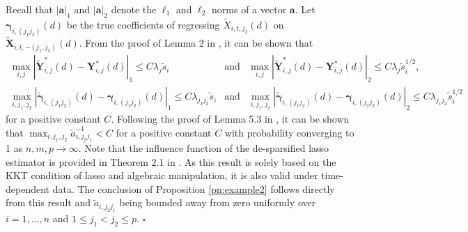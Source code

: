 \documentclass[12pt]{article}
\def\bea{\begin{eqnarray}}
\def\eea{\end{eqnarray}}
\def\nn{\nonumber}
\theoremstyle{definition}
\newcommand{\bX}{{\mathbf X}}
\newcommand{\bY}{{\mathbf Y}}
\newcommand{\ba}{{\mathbf a}}
\newcommand{\bgamma}{\boldsymbol{\gamma}}
\begin{document}
Recall that $|\ba|_1$ and $|\ba|_2$ denote the $\ell_1$ and $\ell_2$ norms of a vector $\ba$.
Let $\bgamma_{i, (j_1j_2)}(d)$ be the true coefficients of regressing $\tilde{X}_{i, t, j_2}(d)$ on $\tilde{\bX}_{i, t, -(j_1, j_2)}(d)$.
From the proof of Lemma 2 in \cite{ChangQiuYao_2016}, it can be shown that 
\bea
\max_{i, j}|\tilde{\bY}_{i, j}^{\ast}(d) - \bY_{i, j}^{\ast}(d) |_1 \leq C \lambda_{j} \tilde{s}_i
&\mbox{and}&
\max_{i, j}|\tilde{\bY}_{i, j}^{\ast}(d) - \bY_{i, j}^{\ast}(d) |_2 \leq C \lambda_{j} \tilde{s}_i^{1/2}, \nn \\
\max_{i, j_1, j_2}|\tilde{\bgamma}_{i, (j_1j_2)}(d) - \bgamma_{i, (j_1j_2)}(d) |_1 \leq C \lambda_{j_1j_2} \tilde{s}_i
&\mbox{and}&
\max_{i, j_1, j_2}|\tilde{\bgamma}_{i, (j_1j_2)}(d) - \bgamma_{i, (j_1j_2)}(d) |_2 \leq C \lambda_{j_1j_2} \tilde{s}_i^{1/2} \nn 
\eea
for a positive constant $C$.
Following the proof of Lemma 5.3 in \cite{vanderGeerRitov2014}, it can be shown that $\max_{i, j_1, j_2}\tilde{a}_{i, j_2j_1}^{-1} < C$ for a positive constant $C$ with probability converging to 1 as $n, m, p \to \infty$.
Note that the influence function of the de-sparsified lasso estimator is provided in Theorem 2.1 in \cite{vanderGeerRitov2014}. As this result is solely based on the KKT condition of lasso and algebraic manipulation, it is also valid under time-dependent data.
The conclusion of Proposition \ref{pn:example2} follows directly from this result and $\tilde{a}_{i, j_2j_1}$ being bounded away from zero uniformly over $i = 1, \ldots, n$ and $1 \leq j_1 < j_2 \leq p$. $\square$

\fi



\end{document}

